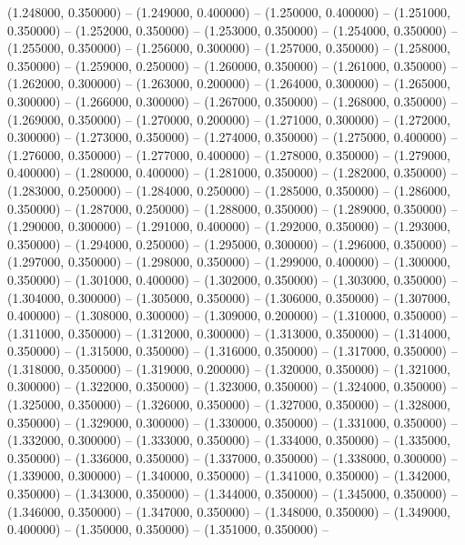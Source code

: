 (1.248000, 0.350000) -- 
(1.249000, 0.400000) -- 
(1.250000, 0.400000) -- 
(1.251000, 0.350000) -- 
(1.252000, 0.350000) -- 
(1.253000, 0.350000) -- 
(1.254000, 0.350000) -- 
(1.255000, 0.350000) -- 
(1.256000, 0.300000) -- 
(1.257000, 0.350000) -- 
(1.258000, 0.350000) -- 
(1.259000, 0.250000) -- 
(1.260000, 0.350000) -- 
(1.261000, 0.350000) -- 
(1.262000, 0.300000) -- 
(1.263000, 0.200000) -- 
(1.264000, 0.300000) -- 
(1.265000, 0.300000) -- 
(1.266000, 0.300000) -- 
(1.267000, 0.350000) -- 
(1.268000, 0.350000) -- 
(1.269000, 0.350000) -- 
(1.270000, 0.200000) -- 
(1.271000, 0.300000) -- 
(1.272000, 0.300000) -- 
(1.273000, 0.350000) -- 
(1.274000, 0.350000) -- 
(1.275000, 0.400000) -- 
(1.276000, 0.350000) -- 
(1.277000, 0.400000) -- 
(1.278000, 0.350000) -- 
(1.279000, 0.400000) -- 
(1.280000, 0.400000) -- 
(1.281000, 0.350000) -- 
(1.282000, 0.350000) -- 
(1.283000, 0.250000) -- 
(1.284000, 0.250000) -- 
(1.285000, 0.350000) -- 
(1.286000, 0.350000) -- 
(1.287000, 0.250000) -- 
(1.288000, 0.350000) -- 
(1.289000, 0.350000) -- 
(1.290000, 0.300000) -- 
(1.291000, 0.400000) -- 
(1.292000, 0.350000) -- 
(1.293000, 0.350000) -- 
(1.294000, 0.250000) -- 
(1.295000, 0.300000) -- 
(1.296000, 0.350000) -- 
(1.297000, 0.350000) -- 
(1.298000, 0.350000) -- 
(1.299000, 0.400000) -- 
(1.300000, 0.350000) -- 
(1.301000, 0.400000) -- 
(1.302000, 0.350000) -- 
(1.303000, 0.350000) -- 
(1.304000, 0.300000) -- 
(1.305000, 0.350000) -- 
(1.306000, 0.350000) -- 
(1.307000, 0.400000) -- 
(1.308000, 0.300000) -- 
(1.309000, 0.200000) -- 
(1.310000, 0.350000) -- 
(1.311000, 0.350000) -- 
(1.312000, 0.300000) -- 
(1.313000, 0.350000) -- 
(1.314000, 0.350000) -- 
(1.315000, 0.350000) -- 
(1.316000, 0.350000) -- 
(1.317000, 0.350000) -- 
(1.318000, 0.350000) -- 
(1.319000, 0.200000) -- 
(1.320000, 0.350000) -- 
(1.321000, 0.300000) -- 
(1.322000, 0.350000) -- 
(1.323000, 0.350000) -- 
(1.324000, 0.350000) -- 
(1.325000, 0.350000) -- 
(1.326000, 0.350000) -- 
(1.327000, 0.350000) -- 
(1.328000, 0.350000) -- 
(1.329000, 0.300000) -- 
(1.330000, 0.350000) -- 
(1.331000, 0.350000) -- 
(1.332000, 0.300000) -- 
(1.333000, 0.350000) -- 
(1.334000, 0.350000) -- 
(1.335000, 0.350000) -- 
(1.336000, 0.350000) -- 
(1.337000, 0.350000) -- 
(1.338000, 0.300000) -- 
(1.339000, 0.300000) -- 
(1.340000, 0.350000) -- 
(1.341000, 0.350000) -- 
(1.342000, 0.350000) -- 
(1.343000, 0.350000) -- 
(1.344000, 0.350000) -- 
(1.345000, 0.350000) -- 
(1.346000, 0.350000) -- 
(1.347000, 0.350000) -- 
(1.348000, 0.350000) -- 
(1.349000, 0.400000) -- 
(1.350000, 0.350000) -- 
(1.351000, 0.350000) -- 
